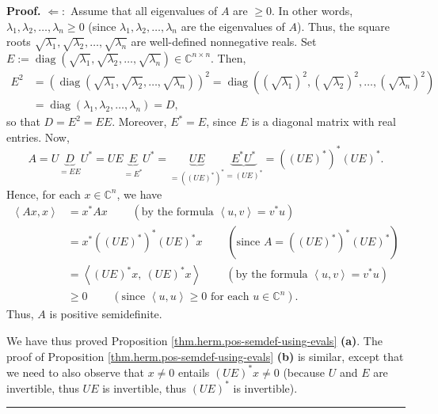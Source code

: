 \documentclass[numbers=enddot,12pt,final,onecolumn,notitlepage]{scrartcl}%
\numberwithin{exer}{subsection}
\theoremstyle{definition}
\newenvironment{proof}[1][Proof]{\noindent\textbf{#1.} }{\ \rule{0.5em}{0.5em}}
\begin{document}
\begin{proof}
$\Longleftarrow:$ Assume that all eigenvalues of $A$ are $\geq0$. In other
words, $\lambda_{1},\lambda_{2},\ldots,\lambda_{n}\geq0$ (since $\lambda
_{1},\lambda_{2},\ldots,\lambda_{n}$ are the eigenvalues of $A$). Thus, the
square roots $\sqrt{\lambda_{1}},\sqrt{\lambda_{2}},\ldots,\sqrt{\lambda_{n}}$
are well-defined nonnegative reals. Set $E:=\operatorname*{diag}\left(
\sqrt{\lambda_{1}},\sqrt{\lambda_{2}},\ldots,\sqrt{\lambda_{n}}\right)
\in\mathbb{C}^{n\times n}$. Then,%
\begin{align*}
E^{2}  &  =\left(  \operatorname*{diag}\left(  \sqrt{\lambda_{1}}%
,\sqrt{\lambda_{2}},\ldots,\sqrt{\lambda_{n}}\right)  \right)  ^{2}%
=\operatorname*{diag}\left(  \left(  \sqrt{\lambda_{1}}\right)  ^{2},\left(
\sqrt{\lambda_{2}}\right)  ^{2},\ldots,\left(  \sqrt{\lambda_{n}}\right)
^{2}\right) \\
&  =\operatorname*{diag}\left(  \lambda_{1},\lambda_{2},\ldots,\lambda
_{n}\right)  =D,
\end{align*}
so that $D=E^{2}=EE$. Moreover, $E^{\ast}=E$, since $E$ is a diagonal matrix
with real entries. Now,%
\[
A=U\underbrace{D}_{=EE}U^{\ast}=UE\underbrace{E}_{=E^{\ast}}U^{\ast
}=\underbrace{UE}_{=\left(  \left(  UE\right)  ^{\ast}\right)  ^{\ast}%
}\underbrace{E^{\ast}U^{\ast}}_{=\left(  UE\right)  ^{\ast}}=\left(  \left(
UE\right)  ^{\ast}\right)  ^{\ast}\left(  UE\right)  ^{\ast}.
\]
Hence, for each $x\in\mathbb{C}^{n}$, we have%
\begin{align*}
\left\langle Ax,x\right\rangle  &  =x^{\ast}Ax\ \ \ \ \ \ \ \ \ \ \left(
\text{by the formula }\left\langle u,v\right\rangle =v^{\ast}u\right) \\
&  =x^{\ast}\left(  \left(  UE\right)  ^{\ast}\right)  ^{\ast}\left(
UE\right)  ^{\ast}x\ \ \ \ \ \ \ \ \ \ \left(  \text{since }A=\left(  \left(
UE\right)  ^{\ast}\right)  ^{\ast}\left(  UE\right)  ^{\ast}\right) \\
&  =\left\langle \left(  UE\right)  ^{\ast}x,\ \left(  UE\right)  ^{\ast
}x\right\rangle \ \ \ \ \ \ \ \ \ \ \left(  \text{by the formula }\left\langle
u,v\right\rangle =v^{\ast}u\right) \\
&  \geq0\ \ \ \ \ \ \ \ \ \ \left(  \text{since }\left\langle u,u\right\rangle
\geq0\text{ for each }u\in\mathbb{C}^{n}\right)  .
\end{align*}
Thus, $A$ is positive semidefinite.

We have thus proved Proposition \ref{thm.herm.pos-semdef-using-evals}
\textbf{(a)}. The proof of Proposition \ref{thm.herm.pos-semdef-using-evals}
\textbf{(b)} is similar, except that we need to also observe that $x\neq0$
entails $\left(  UE\right)  ^{\ast}x\neq0$ (because $U$ and $E$ are
invertible, thus $UE$ is invertible, thus $\left(  UE\right)  ^{\ast}$ is invertible).
\end{proof}
\end{document}
